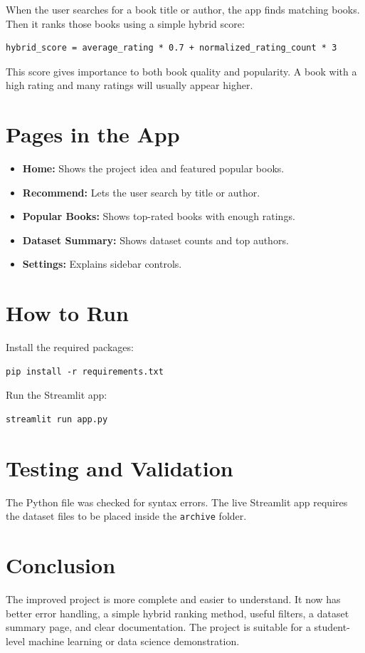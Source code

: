 \documentclass[12pt]{article}
\begin{document}
When the user searches for a book title or author, the app finds matching books. Then it ranks those books using a simple hybrid score:
\begin{verbatim}
hybrid_score = average_rating * 0.7 + normalized_rating_count * 3
\end{verbatim}

This score gives importance to both book quality and popularity. A book with a high rating and many ratings will usually appear higher.

\section{Pages in the App}
\begin{itemize}[leftmargin=*]
    \item \textbf{Home:} Shows the project idea and featured popular books.
    \item \textbf{Recommend:} Lets the user search by title or author.
    \item \textbf{Popular Books:} Shows top-rated books with enough ratings.
    \item \textbf{Dataset Summary:} Shows dataset counts and top authors.
    \item \textbf{Settings:} Explains sidebar controls.
\end{itemize}

\section{How to Run}
Install the required packages:
\begin{verbatim}
pip install -r requirements.txt
\end{verbatim}

Run the Streamlit app:
\begin{verbatim}
streamlit run app.py
\end{verbatim}

\section{Testing and Validation}
The Python file was checked for syntax errors. The live Streamlit app requires the dataset files to be placed inside the \texttt{archive} folder.

\section{Conclusion}
The improved project is more complete and easier to understand. It now has better error handling, a simple hybrid ranking method, useful filters, a dataset summary page, and clear documentation. The project is suitable for a student-level machine learning or data science demonstration.
\end{document}
